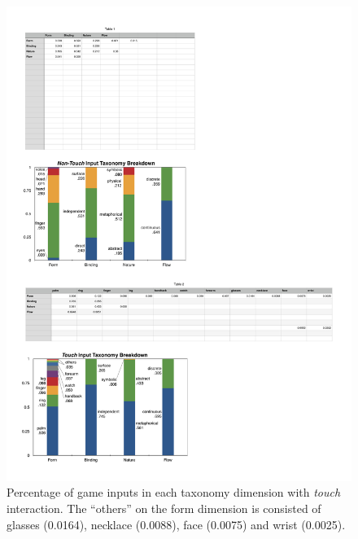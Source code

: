 \documentclass{sigchi}
\begin{document}
 \begin{figure}[!h]
  \centering
  \includegraphics[width=1\columnwidth]{OnbodyTaxonomy.pdf}
  \caption{Percentage of game inputs in each taxonomy dimension with \emph{touch} interaction. The  ``others'' on the form dimension is consisted of glasses (0.0164), necklace (0.0088), face (0.0075) and wrist (0.0025).}
  \label{fig:OnbodyTaxonomy}
  \end{figure} 
\end{document}
